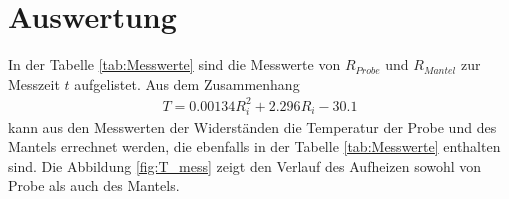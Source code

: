 \section{Auswertung}
\label{sec:Auswertung}

In der Tabelle \ref{tab:Messwerte} sind die Messwerte von
$R_{Probe}$ und $R_{Mantel}$ zur Messzeit $t$ aufgelistet.
Aus dem Zusammenhang
\begin{align}
  T=\num{0.00134} R_i^2 + \num{2.296} R_i - \num{30.1} \label{eqn:inKelvin}
\end{align}
kann aus den Messwerten der Widerständen
die Temperatur der Probe und
des Mantels errechnet werden, die ebenfalls in der
Tabelle \ref{tab:Messwerte} enthalten sind.
Die Abbildung \ref{fig:T_mess} zeigt den
Verlauf des Aufheizen sowohl von Probe
als auch des Mantels.




